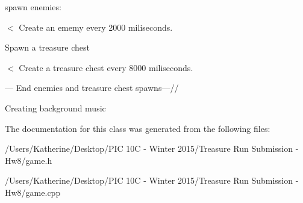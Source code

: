 spawn enemies\+:

$<$ Create an ememy every 2000 miliseconds.

Spawn a treasure chest

$<$ Create a treasure chest every 8000 miliseconds.

--- End enemies and treasure chest spawns---//

Creating background music 

The documentation for this class was generated from the following files\+:\begin{DoxyCompactItemize}
\item 
/\+Users/\+Katherine/\+Desktop/\+P\+I\+C 10\+C -\/ Winter 2015/\+Treasure Run Submission -\/ Hw8/game.\+h\item 
/\+Users/\+Katherine/\+Desktop/\+P\+I\+C 10\+C -\/ Winter 2015/\+Treasure Run Submission -\/ Hw8/game.\+cpp\end{DoxyCompactItemize}
